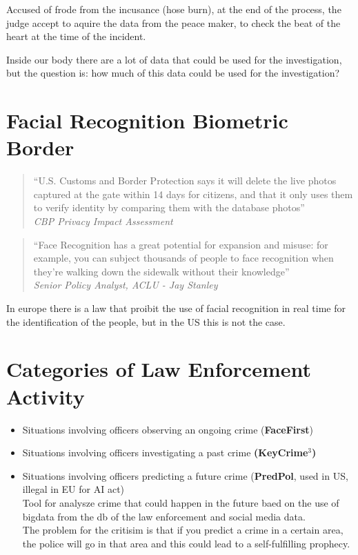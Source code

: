 Accused of frode from the incusance (hose burn), at the end of the process, the judge accept to aquire the data from the peace maker, to check the beat of the heart at the time of the incident. \bigskip

Inside our body there are a lot of data that could be used for the investigation, but the question is: how much of this data could be used for the investigation? 

\section{Facial Recognition Biometric Border}

\begin{multicols}{2}
    \begin{quote}
        “U.S. Customs and Border Protection says it will delete the live photos captured at the gate within 14 days for citizens, and that it only uses them to verify identity by comparing them with the database photos”  \\
        \textit{CBP Privacy Impact Assessment}
    \end{quote}

    \begin{quote}
        “Face Recognition has a great potential for expansion and misuse: for example, you can subject thousands of people to face recognition when they’re walking down the sidewalk without their knowledge”  \\
        \textit{Senior Policy Analyst, ACLU - Jay Stanley}
    \end{quote}
\end{multicols}

In europe there is a law that proibit the use of facial recognition in real time for the identification of the people, but in the US this is not the case. \bigskip

\section{Categories of Law Enforcement Activity}

\begin{itemize}[itemsep=0pt]
    \item Situations involving officers observing an ongoing crime (\textbf{FaceFirst})
    \item Situations involving officers investigating a past crime \textbf{(KeyCrime$^3$)}
    \item Situations involving officers predicting a future crime (\textbf{PredPol}, used in US, illegal in EU for AI act) \\ Tool for analysze crime that could happen in the future baed on the use of bigdata from the db of the law enforcement and social media data. \\ The problem for the critisim is that if you predict a crime in a certain area, the police will go in that area and this could lead to a self-fulfilling prophecy.
\end{itemize}

